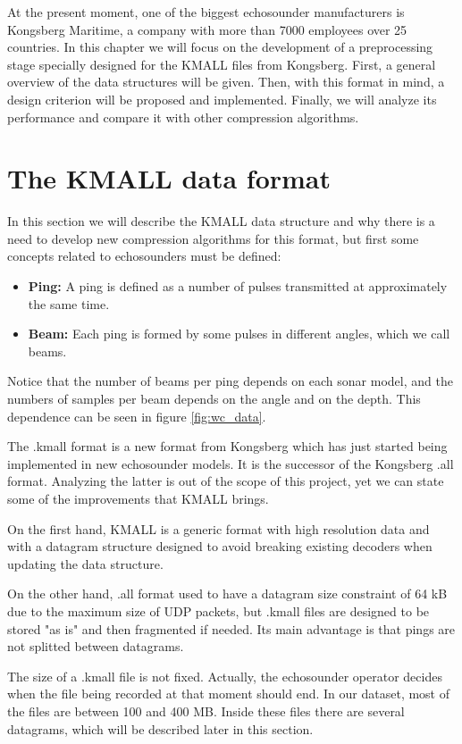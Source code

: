 At the present moment, one of the biggest echosounder manufacturers is Kongsberg Maritime, a company with more than 7000 employees over 25 countries. In this chapter we will focus on the development of a preprocessing stage specially designed for the KMALL files from Kongsberg. First, a general overview of the data structures will be given. Then, with this format in mind, a design criterion will be proposed and implemented. Finally, we will analyze its performance and compare it with other compression algorithms.

\section{The KMALL data format} \label{sec:kmall_format}
In this section we will describe the KMALL data structure and why there is a need to develop new compression algorithms for this format, but first some concepts related to echosounders must be defined:
\begin{itemize}
	\item \textbf{Ping:} A ping is defined as a number of pulses transmitted at approximately the same time.
	\item \textbf{Beam:} Each ping is formed by some pulses in different angles, which we call beams.
\end{itemize}

Notice that the number of beams per ping depends on each sonar model, and the numbers of samples per beam depends on the angle and on the depth. This dependence can be seen in figure \ref{fig:wc_data}.

The .kmall format is a new format from Kongsberg which has just started being implemented in new echosounder models. It is the successor of the Kongsberg .all format. Analyzing the latter is out of the scope of this project, yet we can state some of the improvements that KMALL brings.

On the first hand, KMALL is a generic format with high resolution data and with a datagram structure designed to avoid breaking existing decoders when updating the data structure.

On the other hand, .all format used to have a datagram size constraint of 64 kB due to the maximum size of UDP packets, but .kmall files are designed to be stored "as is" and then fragmented if needed. Its main advantage is that pings are not splitted between datagrams.

The size of a .kmall file is not fixed. Actually, the echosounder operator decides when the file being recorded at that moment should end. In our dataset, most of the files are between 100 and 400 MB. Inside these files there are several datagrams, which will be described later in this section.

